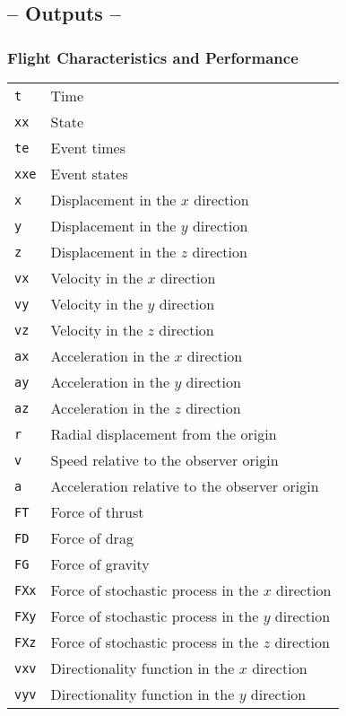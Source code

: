 \documentclass[11pt]{thesis}
\numberwithin{equation}{section}
\begin{document}
\subsection*{-- Outputs --}
\subsubsection*{Flight Characteristics and Performance}
\begin{longtable}[l]{l l}
\texttt{t} & Time \\
\texttt{xx} & State \\
\texttt{te} & Event times \\
\texttt{xxe} & Event states \\
\texttt{x} & Displacement in the $x$ direction \\
\texttt{y} & Displacement in the $y$ direction \\
\texttt{z} & Displacement in the $z$ direction \\
\texttt{vx} & Velocity in the $x$ direction \\
\texttt{vy} & Velocity in the $y$ direction \\
\texttt{vz} & Velocity in the $z$ direction \\
\texttt{ax} & Acceleration in the $x$ direction \\
\texttt{ay} & Acceleration in the $y$ direction \\
\texttt{az} & Acceleration in the $z$ direction \\
\texttt{r} & Radial displacement from the origin \\
\texttt{v} & Speed relative to the observer origin \\
\texttt{a} & Acceleration relative to the observer origin \\
\texttt{FT} & Force of thrust \\
\texttt{FD} & Force of drag \\
\texttt{FG} & Force of gravity \\
\texttt{FXx} & Force of stochastic process in the $x$ direction \\
\texttt{FXy} & Force of stochastic process in the $y$ direction \\
\texttt{FXz} & Force of stochastic process in the $z$ direction \\
\texttt{vxv} & Directionality function in the $x$ direction \\
\texttt{vyv} & Directionality function in the $y$ direction \\

\end{longtable}
\end{document}
